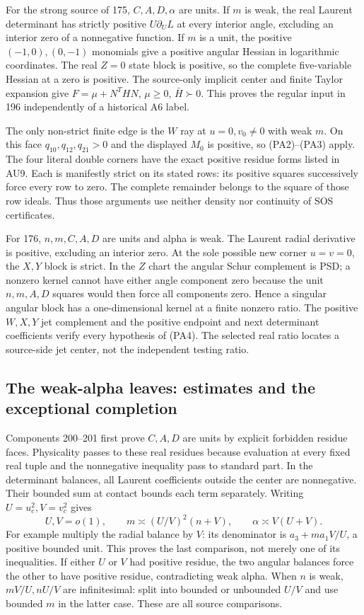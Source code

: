 For the strong source of 175, $C,A,D,\alpha$ are units.  If $m$
is weak, the real Laurent determinant has strictly positive
$U\partial_U L$ at every interior angle, excluding an interior
zero of a nonnegative function.  If $m$ is a unit, the positive
$(-1,0),(0,-1)$ monomials give a positive angular Hessian in
logarithmic coordinates.  The real $Z=0$ state block is positive,
so the complete five-variable Hessian at a zero is positive.
The source-only implicit center and finite Taylor expansion give
$F=\mu+N^THN$, $\mu\geq0$, $\bar H\succ0$.  This proves the
regular input in 196 independently of a historical A6 label.

The only non-strict finite edge is the $W$ ray at $u=0,v_0\ne0$
with weak $m$.  On this face $q_{10},q_{12},q_{21}>0$ and the
displayed $M_0$ is positive, so (PA2)--(PA3) apply.  The four
literal double corners have the exact positive residue forms
listed in AU9.  Each is manifestly strict on its stated rows:
its positive squares successively force every row to zero.
The complete remainder belongs to the square of those row ideals.
Thus those arguments use neither density nor continuity of SOS
certificates.

For 176, $n,m,C,A,D$ are units and alpha is weak.  The Laurent
radial derivative is positive, excluding an interior zero.
At the sole possible new corner $u=v=0$, the $X,Y$ block is
strict.  In the $Z$ chart the angular Schur complement is PSD;
a nonzero kernel cannot have either angle component zero because
the unit $n,m,A,D$ squares would then force all components zero.
Hence a singular angular block has a one-dimensional kernel at
a finite nonzero ratio.  The positive $W,X,Y$ jet complement and
the positive endpoint and next determinant coefficients verify
every hypothesis of (PA4).  The selected real ratio locates a
source-side jet center, not the independent testing ratio.

\subsection{The weak-alpha leaves: estimates and the exceptional completion}

Components 200--201 first prove $C,A,D$ are units by explicit
forbidden residue faces.  Physicality passes to these real residues
because evaluation at every fixed real tuple and the nonnegative
inequality pass to standard part.  In the determinant balances,
all Laurent coefficients outside the center are nonnegative.
Their bounded sum at contact bounds each term separately.
Writing $U=u_c^2,V=v_c^2$ gives
\[
 U,V=o(1),\qquad m\asymp(U/V)^2(n+V),\qquad
 \alpha\asymp V(U+V).                               \tag{PA5}
\]
For example multiply the radial balance by $V$: its denominator
is $a_3+ma_1V/U$, a positive bounded unit.  This proves the last
comparison, not merely one of its inequalities.  If either $U$
or $V$ had positive residue, the two angular balances force the
other to have positive residue, contradicting weak alpha.
When $n$ is weak, $mV/U,nU/V$ are infinitesimal: split into
bounded or unbounded $U/V$ and use bounded $m$ in the latter case.
These are all source comparisons.

